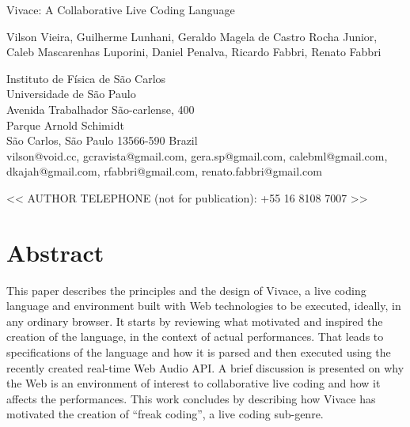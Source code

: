 \documentclass[letterpaper, 12pt]{article}
\begin{document}
 {\cmjTitle Vivace: A Collaborative Live Coding Language}

{\cmjAuthor Vilson Vieira, Guilherme Lunhani, Geraldo Magela de Castro
  Rocha Junior, Caleb Mascarenhas Luporini, Daniel Penalva, Ricardo
  Fabbri, Renato Fabbri
\newline
\begin{cmjAuthorAddress}
  Instituto de F\'{i}sica de S\~{a}o Carlos\\
  Universidade de S\~{a}o Paulo\\
  Avenida Trabalhador S\~{a}o-carlense, 400\\
  Parque Arnold Schimidt\\
  S\~{a}o Carlos, S\~{a}o Paulo 13566-590 Brazil\\

  vilson@void.cc, gcravista@gmail.com, gera.sp@gmail.com,
  calebml@gmail.com, dkajah@gmail.com, rfabbri@gmail.com,
  renato.fabbri@gmail.com
\end{cmjAuthorAddress}

\vspace*{24pt}

{\cmjAuthorPhone << AUTHOR TELEPHONE (not for publication): +55 16 8108 7007 >>}
\section*{Abstract}

This paper describes the principles and the design of Vivace, a live
coding language and environment built with Web technologies to be
executed, ideally, in any ordinary browser. It starts by reviewing
what motivated and inspired the creation of the language, in the
context of actual performances. That leads to specifications of the
language and how it is parsed and then executed using the recently
created real-time Web Audio API. A brief discussion is presented on
why the Web is an environment of interest to collaborative live coding
and how it affects the performances. This work concludes by describing
how Vivace has motivated the creation of ``freak coding'', a live
coding sub-genre.

\section*{} %

}
\end{document}
